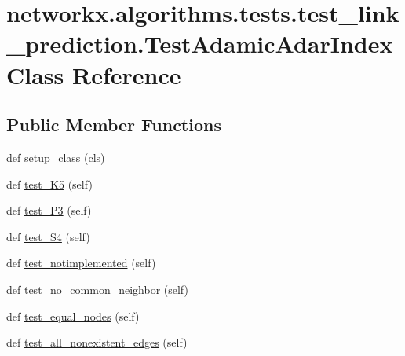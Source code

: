 \hypertarget{classnetworkx_1_1algorithms_1_1tests_1_1test__link__prediction_1_1TestAdamicAdarIndex}{}\section{networkx.\+algorithms.\+tests.\+test\+\_\+link\+\_\+prediction.\+Test\+Adamic\+Adar\+Index Class Reference}
\label{classnetworkx_1_1algorithms_1_1tests_1_1test__link__prediction_1_1TestAdamicAdarIndex}
\subsection*{Public Member Functions}
\begin{DoxyCompactItemize}
\item 
def \hyperlink{classnetworkx_1_1algorithms_1_1tests_1_1test__link__prediction_1_1TestAdamicAdarIndex_a59daf19d189111b77d2449a6c38a5026}{setup\+\_\+class} (cls)
\item 
def \hyperlink{classnetworkx_1_1algorithms_1_1tests_1_1test__link__prediction_1_1TestAdamicAdarIndex_a145c4c29fb88fa1a80aa35e55c42c459}{test\+\_\+\+K5} (self)
\item 
def \hyperlink{classnetworkx_1_1algorithms_1_1tests_1_1test__link__prediction_1_1TestAdamicAdarIndex_a414e4f6dd3337832cfba3220154af040}{test\+\_\+\+P3} (self)
\item 
def \hyperlink{classnetworkx_1_1algorithms_1_1tests_1_1test__link__prediction_1_1TestAdamicAdarIndex_ac921030de8e4f42b9b6c3b5d0467d3f6}{test\+\_\+\+S4} (self)
\item 
def \hyperlink{classnetworkx_1_1algorithms_1_1tests_1_1test__link__prediction_1_1TestAdamicAdarIndex_a0414abaa7d8144933ca3597605a17cf7}{test\+\_\+notimplemented} (self)
\item 
def \hyperlink{classnetworkx_1_1algorithms_1_1tests_1_1test__link__prediction_1_1TestAdamicAdarIndex_a2d6372fb50736d6822ac97fa0445f1c5}{test\+\_\+no\+\_\+common\+\_\+neighbor} (self)
\item 
def \hyperlink{classnetworkx_1_1algorithms_1_1tests_1_1test__link__prediction_1_1TestAdamicAdarIndex_abdaccf90cf0f9f86a694f22b05f66834}{test\+\_\+equal\+\_\+nodes} (self)
\item 
def \hyperlink{classnetworkx_1_1algorithms_1_1tests_1_1test__link__prediction_1_1TestAdamicAdarIndex_afea553963f29c5c3b5b605a3919287af}{test\+\_\+all\+\_\+nonexistent\+\_\+edges} (self)
\end{DoxyCompactItemize}
